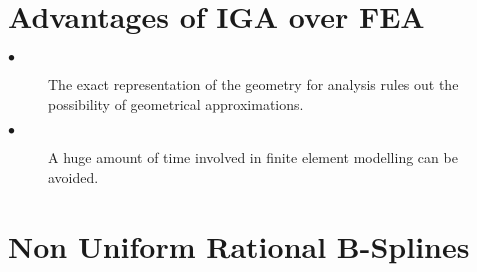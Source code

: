 \documentclass[12pt]{article}
\begin{document}
\section{Advantages of IGA over FEA}
\begin{description}
\item[$\bullet$]   The exact representation of the geometry for analysis rules out the possibility of geometrical approximations.
\item[$\bullet$]   A huge amount of time involved in finite element modelling can be avoided.
\end{description}

\section{Non Uniform Rational B-Splines }
\end{document}
